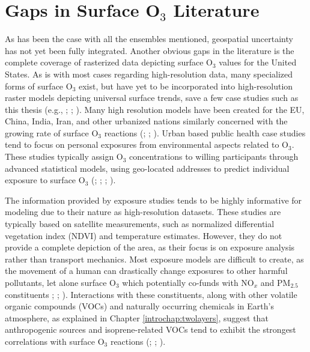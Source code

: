 \section{Gaps in Surface O$_3$ Literature} \label{litreview:gaps} As has been the case with all the ensembles mentioned, geospatial uncertainty has not yet been fully integrated. Another obvious gaps in the literature is the complete coverage of rasterized data depicting surface O$_3$ values for the United States. As is with most cases regarding high-resolution data, many specialized forms of surface O$_3$ exist, but have yet to be incorporated into high-resolution raster models depicting universal surface trends, save a few case studies such as this thesis (e.g., \cite{choi_summertime_2012}; \cite{rui_zhu_rapid_2023}; \cite{xiao_lu_wildfire_2016}). Many high resolution models have been created for the EU, China, India, Iran, and other urbanized nations similarly concerned with the growing rate of surface O$_3$ reactions (\cite{dong_assessment_2021}; \cite{li_estimation_2023}; \cite{tian_assessing_2024}). Urban based public health case studies tend to focus on personal exposures from environmental aspects related to O$_3$. These studies typically assign O$_3$ concentrations to willing participants through advanced statistical models, using geo-located addresses to predict individual exposure to surface O$_3$ (\cite{ghozikali_effect_2015}; \cite{jerrett2009}; \cite{crouse_ambient_2015}; \cite{turner_long-term_2016}). 

The information provided by exposure studies tends to be highly informative for modeling due to their nature as high-resolution datasets. These studies are typically based on satellite measurements, such as normalized differential vegetation index (NDVI) and temperature estimates. However, they do not provide a complete depiction of the area, as their focus is on exposure analysis rather than transport mechanics. Most exposure models are difficult to create, as the movement of a human can drastically change exposures to other harmful pollutants, let alone surface O$_3$ which potentially co-funds with NO$_x$ and PM$_2.5$ constituents \cite{malley_updated_2017}; \cite{vardoulakis_intra-urban_2011}; \cite{turner_long-term_2016}). Interactions with these constituents, along with other volatile organic compounds (VOCs) and naturally occurring chemicals in Earth’s atmosphere, as explained in Chapter \ref{introchap:twolayers}, suggest that anthropogenic sources and isoprene-related VOCs tend to exhibit the strongest correlations with surface O$_3$ reactions (\cite{wang_evolution_2023}; \cite{nelson_comprehensive_2023}; \cite{ni_surface_2024}). 

